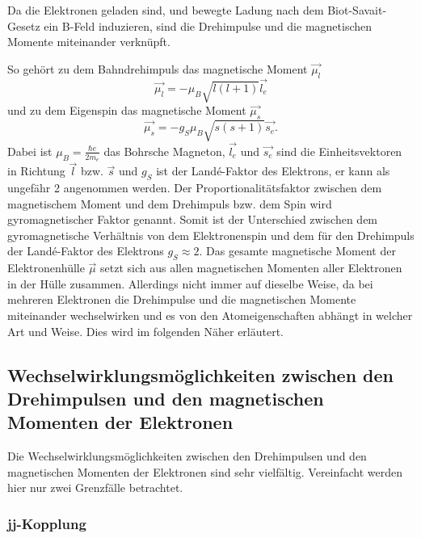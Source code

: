 
Da die Elektronen geladen sind, und bewegte Ladung nach dem Biot-Savait-Gesetz ein B-Feld induzieren, 
sind die Drehimpulse und die magnetischen Momente miteinander verknüpft.


So gehört zu dem Bahndrehimpuls das magnetische Moment $\vec{\mu_l}$
\begin{equation*}
    \vec{\mu_l} = - \mu_B \sqrt{l(l+1)} \vec{l_e}
\end{equation*}
und zu dem Eigenspin das magnetische Moment $\vec{\mu_s}$
\begin{equation*}
    \vec{\mu_s} = - g_S \mu_B \sqrt{s(s+1)} \vec{s_e}.
\end{equation*}
Dabei ist $\mu_B = \frac{\hbar e}{2 m_e}$ das Bohrsche Magneton, $\vec{l_e}$ und $ \vec{s_e}$ sind die 
Einheitsvektoren in Richtung $\vec{l}$ bzw. $\vec{s}$
und $g_S$ ist der Landé-Faktor des Elektrons, er kann als ungefähr 2 angenommen werden. 
Der Proportionalitätsfaktor zwischen dem magnetischem Moment und dem Drehimpuls bzw. dem Spin wird 
gyromagnetischer Faktor genannt. Somit ist der 
Unterschied zwischen dem gyromagnetische Verhältnis von dem Elektronenspin und dem für den Drehimpuls
der Landé-Faktor des Elektrons $g_S \approx 2$.
Das gesamte magnetische Moment der Elektronenhülle $\vec{\mu}$ setzt sich aus allen magnetischen 
Momenten aller Elektronen in der Hülle zusammen. Allerdings nicht immer auf dieselbe Weise, da 
bei mehreren Elektronen die Drehimpulse und die magnetischen Momente miteinander wechselwirken
und es von den Atomeigenschaften abhängt in welcher Art und Weise. Dies wird im folgenden Näher erläutert. 



\subsection{Wechselwirklungsmöglichkeiten zwischen den Drehimpulsen und den magnetischen Momenten der Elektronen}

Die Wechselwirklungsmöglichkeiten zwischen den Drehimpulsen und den magnetischen Momenten der Elektronen 
sind sehr vielfältig. 
Vereinfacht werden hier nur zwei Grenzfälle betrachtet.

\subsubsection{jj-Kopplung}

